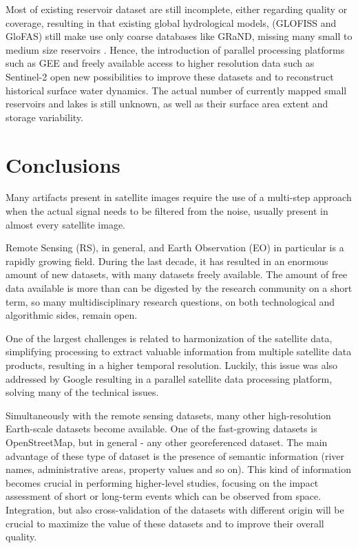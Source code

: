 Most of existing reservoir dataset are still incomplete, either regarding quality or coverage, resulting in that existing global hydrological models, (GLOFISS and GloFAS) still make use only coarse databases like GRaND, missing many small to medium size reservoirs \cite{emerton2016continental}.  Hence, the introduction of parallel processing platforms such as GEE and freely available access to higher resolution data such as Sentinel-2 open new possibilities to improve these datasets and to reconstruct historical surface water dynamics. The actual number of currently mapped small reservoirs and lakes is still unknown, as well as their surface area extent and storage variability.

\section{Conclusions}

Many artifacts present in satellite images require the use of a multi-step approach when the actual signal needs to be filtered from the noise, usually present in almost every satellite image.

Remote Sensing (RS), in general, and Earth Observation (EO) in particular is a rapidly growing field. During the last decade, it has resulted in an enormous amount of new datasets, with many datasets freely available. The amount of free data available is more than can be digested by the research community on a short term, so many multidisciplinary research questions, on both technological and algorithmic sides, remain open. 

One of the largest challenges is related to harmonization of the satellite data, simplifying processing to extract valuable information from multiple satellite data products, resulting in a higher temporal resolution. Luckily, this issue was also addressed by Google resulting in a parallel satellite data processing platform, solving many of the technical issues.

Simultaneously with the remote sensing datasets, many other high-resolution Earth-scale datasets become available. One of the fast-growing datasets is OpenStreetMap, but in general - any other georeferenced dataset. The main advantage of these type of dataset is the presence of semantic information (river names, administrative areas, property values and so on). This kind of information becomes crucial in performing higher-level studies, focusing on the impact assessment of short or long-term events which can be observed from space. Integration, but also cross-validation of the datasets with different origin will be crucial to maximize the value of these datasets and to improve their overall quality.

